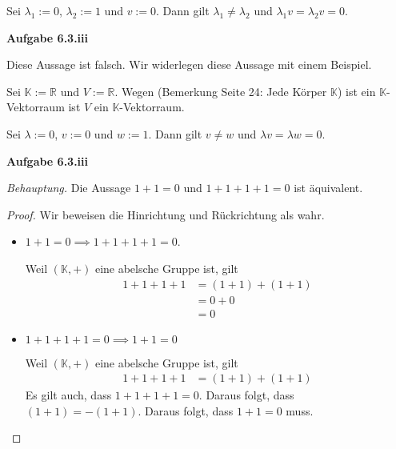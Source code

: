 \documentclass[12pt]{extarticle}
\newcommand{\ib}[1]{\boldsymbol{\mathit{#1}}}
\newcommand{\mg}[1]{\mathbb{#1}}
\begin{document}
Sei \(\lambda_1 := 0\), \(\lambda_2:=1\) und \(\ib{v}:=0\).  Dann gilt
\(\lambda_1 \neq \lambda_2\) und
\(\lambda_1 \ib{v} = \lambda_2 \ib{v} = 0\).

\textbf{Aufgabe 6.3.iii}

Diese Aussage ist falsch. Wir widerlegen diese Aussage mit einem Beispiel.

Sei \(\mg{K}:=\mg{R}\) und \(V:=\mg{R}\). Wegen (Bemerkung Seite 24: Jede
Körper \(\mg{K}\)) ist ein \(\mg{K}\)-Vektorraum ist \(V\) ein \(\mg{K}\)-Vektorraum.

Sei \(\lambda:=0\), \(\ib{v}:=0\) und \(\ib{w}:=1\).  Dann gilt $\ib{v} \neq
\ib{w}$ und \(\lambda\ib{v} = \lambda\ib{w} = 0\).

\textbf{Aufgabe 6.3.iii}

\textit{Behauptung.}  Die Aussage \(1+1=0\) und \(1+1+1+1=0\) ist
äquivalent.

\begin{proof}
  Wir beweisen die Hinrichtung und Rückrichtung als wahr.
  \begin{itemize}
  \item \(1+1=0 \implies 1+1+1+1=0\).

    Weil \((\mg{K},+)\) eine abelsche Gruppe ist, gilt
\begin{align*}
  1+1+1+1 &= (1+1) + (1+1) \tag*{Assoziativität}\\
          &= 0 + 0 \tag*{Voraussetzung}\\
          &= 0 \tag*{Existenz des neutralen Elements}
\end{align*}
\item \(1+1+1+1 = 0 \implies 1+1=0\)

    Weil \((\mg{K},+)\) eine abelsche Gruppe ist, gilt
\begin{align*}
1+1+1+1 &= (1+1) + (1+1)
\end{align*}
Es gilt auch, dass \(1+1+1+1=0\).  Daraus folgt, dass \((1+1)=-(1+1)\).
Daraus folgt, dass \(1+1=0\) muss.
  \end{itemize}
\end{proof}
\end{document}
